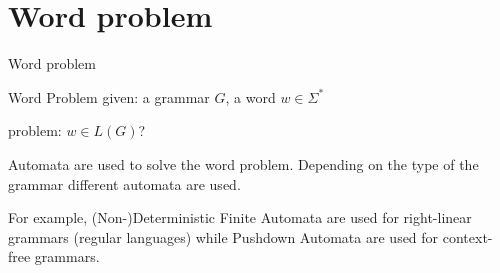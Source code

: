 \documentclass{beamer}
\def\padding{\vspace{0.5cm}}
\begin{document}
\section{Word problem}

\begin{frame}{Word problem}
    \begin{block}{Word Problem}
        given: a grammar $G$, a word $w \in \Sigma^*$\par
        problem: $w \in L(G)$?
    \end{block}\pause\padding
    Automata are used to solve the word problem. Depending on the type of the grammar different automata are used.\par
    For example, (Non-)Deterministic Finite Automata are used for right-linear grammars (regular languages) while Pushdown Automata are used for context-free grammars.
\end{frame}
\end{document}
